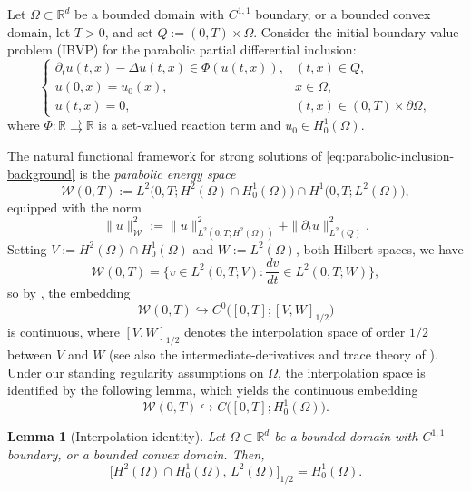 \documentclass[11pt]{elsarticle}
\newtheorem{lemma}[theorem]{Lemma}
\theoremstyle{definition}
\theoremstyle{remark}
\numberwithin{equation}{section}
\begin{document}
Let $\Omega\subset\mathbb{R}^d$ be a bounded domain with $C^{1,1}$ boundary, or a bounded convex domain, let $T>0$, and set
$Q:=(0,T)\times\Omega$.  Consider the initial-boundary value problem 
(IBVP) for the parabolic partial differential inclusion:
\begin{equation}\label{eq:parabolic-inclusion-background}
	\left\{
	\begin{array}{ll}
		\partial_t u(t,x)-\Delta u(t,x)\in\Phi(u(t,x)), & (t,x)\in Q,\\[4pt]
		u(0,x)=u_0(x), & x\in\Omega,\\[4pt]
		u(t,x)=0, & (t,x)\in(0,T)\times\partial\Omega,
	\end{array}
	\right.
\end{equation}
where $\Phi:\mathbb{R}\rightrightarrows\mathbb{R}$ is a set-valued reaction
term and $u_0\in H_0^1(\Omega)$.

The natural functional framework for strong solutions of
\eqref{eq:parabolic-inclusion-background} is the \emph{parabolic energy
space}
\[
\mathcal{W}(0,T)
:=
L^2\bigl(0,T;H^2(\Omega)\cap H_0^1(\Omega)\bigr)
\cap
H^1\bigl(0,T;L^2(\Omega)\bigr),
\]
equipped with the norm
\[
\|u\|_{\mathcal{W}}^2:=\|u\|_{L^2(0,T;H^2(\Omega))}^2
+\|\partial_t u\|_{L^2(Q)}^2.
\]
Setting $V:=H^2(\Omega)\cap H_0^1(\Omega)$
and $W:=L^2(\Omega)$, both Hilbert spaces, we have
\[
\mathcal{W}(0,T)=\Big\{v\in L^2(0,T;V):\frac{dv}{dt}\in L^2(0,T;W)\Big\},
\]
so by \cite[Theorem~II.5.14]{BoyerFabrie2013}, the embedding
\[
\mathcal{W}(0,T)\hookrightarrow
C^0\bigl([0,T];[V,W]_{1/2}\bigr)
\]
is continuous, where $[V,W]_{1/2}$ denotes the interpolation space of
order $1/2$ between $V$ and $W$ (see also the
intermediate-derivatives and trace theory of
\cite[Chapter~1, Theorem~3.1]{LionsMagenes}). Under our standing
regularity assumptions on $\Omega$, the interpolation space is
identified by the following lemma, which yields the continuous
embedding
\begin{equation}\label{eq:W-cont-embedding}
	\mathcal{W}(0,T)\hookrightarrow C\bigl([0,T];H_0^1(\Omega)\bigr).
\end{equation}

\begin{lemma}[Interpolation identity]\label{lem:interp-identity}
	Let $\Omega\subset\mathbb{R}^d$ be a bounded domain with $C^{1,1}$
	boundary, or a bounded convex domain. Then,
	\begin{equation}\label{eq:interp-identity}
		\bigl[H^2(\Omega)\cap H_0^1(\Omega),\,L^2(\Omega)\bigr]_{1/2}
		=
		H_0^1(\Omega).
	\end{equation}
\end{lemma}
\end{document}
